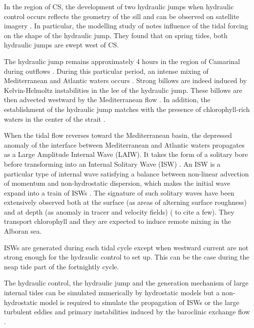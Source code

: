 In the region of CS, the development of two hydraulic jumps when hydraulic control occurs reflects the geometry of the sill and can be observed on satellite imagery \citep{brandt_1996,sanchez-garrido_2011}. In particular, the modelling study of \citet{sanchez-garrido_2011} notes influence of the tidal forcing on the shape of the hydraulic jump. They found that on spring tides, both hydraulic jumps are swept west of CS.

The hydraulic jump remains approximately 4 hours in the region of Camarinal during outflows \citep{FA1988,vlasenko_2009}. During this particular period, an intense mixing of Mediterranean and Atlantic waters occurs \citep{wesson_1994,macias_2006,GarciaLafuente2011}. Strong billows are indeed induced by Kelvin-Helmoltz instabilities in the lee of the hydraulic jump. These billows are then advected westward by the Mediterranean flow \citep{wesson_1994}. In addition, the establishment of the hydraulic jump matches with the presence of chlorophyll-rich waters in the center of the strait \citep{bruno_2013}.

When the tidal flow reverses toward the Mediterranean basin, the depressed anomaly of the interface between Mediterranean and Atlantic waters propagates as a Large Amplitude Internal Wave (LAIW). It takes the form of a solitary bore before transforming into an Internal Solitary Wave (ISW) \citep{FA1988}. An ISW is a particular type of internal wave satisfying a balance between non-linear advection of momentum and non-hydrostatic dispersion, which makes the initial wave expand into a train of ISWs \citep{vlasenko_2000}. The signature of such solitary waves have been extensively observed both at the surface (as areas of alterning surface roughness) and at depth (as anomaly in tracer and velocity fields) (\citet{ziegenbein_1970,FA1988,watson_1990,sanchezgarrido_2008} to cite a few). They transport chlorophyll \citep{bruno_2013} and they are expected to induce remote mixing in the Alboran sea.

ISWs are generated during each tidal cycle except when westward current are not strong enough for the hydraulic control to set up. This can be the case during the neap tide part of the fortnightly cycle\citep{watson_1990}.

The hydraulic control, the hydraulic jump and the generation mechanism of large internal tides can be simulated numerically by hydrostatic models but a non-hydrostatic model is required to simulate the propagation of ISWs or the large turbulent eddies and primary instabilities induced by the baroclinic exchange flow \citep{brandt_1996,vlasenko_2009}.

